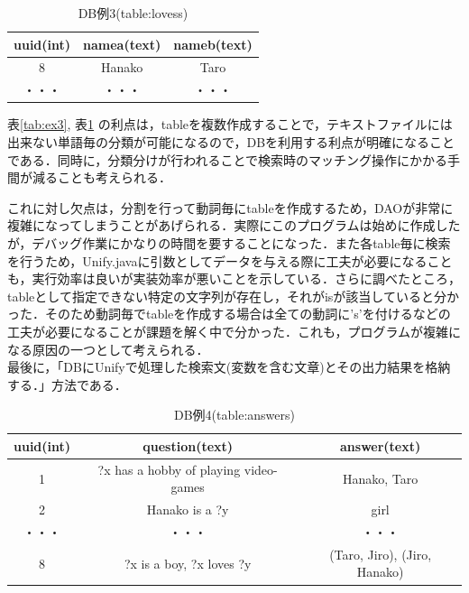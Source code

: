 \documentclass[12pt]{jarticle}
\begin{document}
\begin{table}[htb]
  \begin{center}
    \caption{DB例3(table:lovess)}
	\begin{tabular}{|c|c|c|} \hline
	 uuid(int) & namea(text) & nameb(text) \\ \hline \hline
	8 & Hanako & Taro \\ \hline
	・・・ & ・・・ & ・・・ \\ \hline
	\end{tabular}
    \label{tab:ex4}
  \end{center}
\end{table}

表\ref{tab:ex3}, 表\ref{tab:ex4} の利点は，tableを複数作成することで，テキストファイルには出来ない単語毎の分類が可能になるので，DBを利用する利点が明確になることである．同時に，分類分けが行われることで検索時のマッチング操作にかかる手間が減ることも考えられる．\par
これに対し欠点は，分割を行って動詞毎にtableを作成するため，DAOが非常に複雑になってしまうことがあげられる．実際にこのプログラムは始めに作成したが，デバッグ作業にかなりの時間を要することになった．また各table毎に検索を行うため，Unify.javaに引数としてデータを与える際に工夫が必要になることも，実行効率は良いが実装効率が悪いことを示している．さらに調べたところ，tableとして指定できない特定の文字列が存在し，それがisが該当していると分かった．そのため動詞毎でtableを作成する場合は全ての動詞に's'を付けるなどの工夫が必要になることが課題を解く中で分かった．これも，プログラムが複雑になる原因の一つとして考えられる．\\

最後に，「DBにUnifyで処理した検索文(変数を含む文章)とその出力結果を格納する．」方法である．\\

\clearpage

\begin{table}[htb]
  \begin{center}
    \caption{DB例4(table:answers)}
    \begin{tabular}{|c|c|c|} \hline
      uuid(int) & question(text) & answer(text) \\ \hline \hline
      1 & ?x has a hobby of playing video-games & Hanako, Taro \\ \hline
      2 & Hanako is a ?y & girl \\ \hline
      ・・・ & ・・・ & ・・・ \\ \hline
	  8 & ?x is a boy, ?x loves ?y & (Taro, Jiro), (Jiro, Hanako) \\ \hline
    \end{tabular}
    \label{tab:ex5}
  \end{center}
\end{table}
\end{document}
